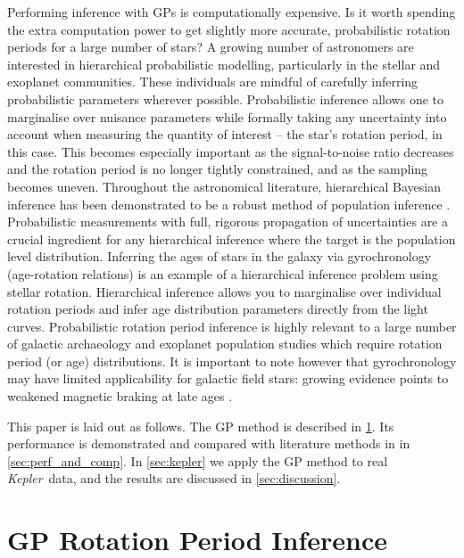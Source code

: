 \documentclass[a4paper,fleqn,usenatbib,useAMS]{mnras}
\newcommand{\response}[1]{{#1}}
\newcommand{\Kepler}{{\it Kepler}}
\newcommand{\kepler}{\Kepler}
\newcommand{\eg}{{\it e.g.}}
\begin{document}
\response{Performing inference with GPs is computationally expensive.
Is it worth spending the extra computation power to get slightly more
accurate, probabilistic rotation periods for a large number of stars?
A growing number of astronomers are interested in hierarchical probabilistic
modelling, particularly in the stellar and exoplanet communities.
These individuals are mindful of carefully inferring probabilistic parameters
wherever possible.
Probabilistic inference allows one to marginalise over nuisance
parameters while formally taking any uncertainty into account when
measuring the quantity of interest -- the star's rotation period, in
this case.
This becomes especially important as the signal-to-noise ratio
decreases and the rotation period is no longer tightly constrained,
and as the sampling becomes uneven.
Throughout the astronomical literature, hierarchical Bayesian
inference has been demonstrated to be a robust method of population
inference \citep[\eg][]{Hogg2010, Foremanmackey2014, Wolfgang2015, Rogers2015}.
Probabilistic measurements with full, rigorous propagation of
uncertainties are a crucial ingredient for any hierarchical inference
where the target is the population level distribution.
Inferring the ages of stars in the galaxy via gyrochronology (age-rotation
relations) \citep[\eg][]{Skumanich1972, Kawaler1989, Barnes2003, Barnes2007}
is an example of a hierarchical inference problem using stellar rotation.
Hierarchical inference allows you to marginalise over individual rotation
periods and infer age distribution parameters directly from the light curves.
Probabilistic rotation period inference is highly relevant to a large number
of galactic archaeology and exoplanet population studies which require
rotation period (or age) distributions.
It is important to note however that gyrochronology may have limited
applicability for galactic field stars: growing evidence points to weakened
magnetic braking at late ages \citep{Angus2015, vanSaders2016}.}

This paper is laid out as follows.
The GP method is described in \textsection \ref{sec:method}.
Its performance is demonstrated and compared with literature methods in
in \textsection \ref{sec:perf_and_comp}.
In \textsection \ref{sec:kepler} we apply the GP method to real \kepler\ data,
and the results are discussed in \textsection \ref{sec:discussion}.

\section{GP Rotation Period Inference}
\label{sec:method}
\end{document}
